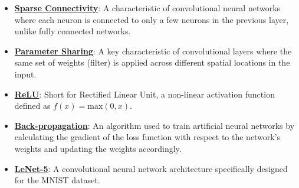 \documentclass{article}%
\begin{document}
\begin{itemize}[leftmargin=*]
\item \href{https://purdue.brightspace.com/d2l/common/assets/pdfjs-d2l-dist/1.0.14-legacy/web/viewer.html?file=\%2Fcontent\%2Fenforced\%2F1095467-wl.202510.CS.24300.001\%2F09L1-cnn.pdf\%3Fou\%3D1095467\&lang=en-us\&container=d2l-fileviewer-rendered-pdf\&fullscreen=d2l-fileviewer-rendered-pdf-dialog\&height=667#page=10}{\textbf{Sparse Connectivity}}: A characteristic of convolutional neural networks where each neuron is connected to only a few neurons in the previous layer, unlike fully connected networks.%
\item \href{https://purdue.brightspace.com/d2l/common/assets/pdfjs-d2l-dist/1.0.14-legacy/web/viewer.html?file=\%2Fcontent\%2Fenforced\%2F1095467-wl.202510.CS.24300.001\%2F09L1-cnn.pdf\%3Fou\%3D1095467\&lang=en-us\&container=d2l-fileviewer-rendered-pdf\&fullscreen=d2l-fileviewer-rendered-pdf-dialog\&height=667#page=12}{\textbf{Parameter Sharing}}: A key characteristic of convolutional layers where the same set of weights (filter) is applied across different spatial locations in the input.%
\item \href{https://purdue.brightspace.com/d2l/common/assets/pdfjs-d2l-dist/1.0.14-legacy/web/viewer.html?file=\%2Fcontent\%2Fenforced\%2F1095467-wl.202510.CS.24300.001\%2F09L1-cnn.pdf\%3Fou\%3D1095467\&lang=en-us\&container=d2l-fileviewer-rendered-pdf\&fullscreen=d2l-fileviewer-rendered-pdf-dialog\&height=667#page=13}{\textbf{ReLU}}: Short for Rectified Linear Unit, a non-linear activation function defined as $f(x) = \text{max}(0, x)$.%
\item \href{https://purdue.brightspace.com/d2l/common/assets/pdfjs-d2l-dist/1.0.14-legacy/web/viewer.html?file=\%2Fcontent\%2Fenforced\%2F1095467-wl.202510.CS.24300.001\%2F09L1-cnn.pdf\%3Fou\%3D1095467\&lang=en-us\&container=d2l-fileviewer-rendered-pdf\&fullscreen=d2l-fileviewer-rendered-pdf-dialog\&height=667#page=16}{\textbf{Back-propagation}}: An algorithm used to train artificial neural networks by calculating the gradient of the loss function with respect to the network's weights and updating the weights accordingly.%
\item \href{https://purdue.brightspace.com/d2l/common/assets/pdfjs-d2l-dist/1.0.14-legacy/web/viewer.html?file=\%2Fcontent\%2Fenforced\%2F1095467-wl.202510.CS.24300.001\%2F09L1-cnn.pdf\%3Fou\%3D1095467\&lang=en-us\&container=d2l-fileviewer-rendered-pdf\&fullscreen=d2l-fileviewer-rendered-pdf-dialog\&height=667#page=22}{\textbf{LeNet-5}}: A convolutional neural network architecture specifically designed for the MNIST dataset.%
\end{itemize}
\end{document}
